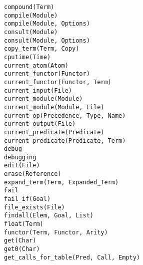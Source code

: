 \begin{tabbing}
 \> {\tt compound(Term)}	\>					\\
 \> {\tt compile(Module)}	\>					\\
 \> {\tt compile(Module, Options)} \>					\\
 \> {\tt consult(Module)}	\>					\\
 \> {\tt consult(Module, Options)} \>					\\
 \> {\tt copy\_term(Term, Copy)} \>					\\
 \> {\tt cputime(Time)}		\>					\\
 \> {\tt current\_atom(Atom)}	\>				\\
 \> {\tt current\_functor(Functor)} \>				\\
 \> {\tt current\_functor(Functor, Term)} \>				\\
 \> {\tt current\_input(File)}	\>					\\
 \> {\tt current\_module(Module)}	\>				\\
 \> {\tt current\_module(Module, File)}	\>				\\
 \> {\tt current\_op(Precedence, Type, Name)} \>			\\
 \> {\tt current\_output(File)}	\>					\\
 \> {\tt current\_predicate(Predicate)} \>				\\
 \> {\tt current\_predicate(Predicate, Term)} \>			\\
 \> {\tt debug}			\>					\\
 \> {\tt debugging}		\>					\\
 \> {\tt edit(File)}		\>					\\
 \> {\tt erase(Reference)}	\>					\\
 \> {\tt expand\_term(Term, Expanded\_Term)} \>				\\
 \> {\tt fail}			\>					\\
 \> {\tt fail\_if(Goal)}	\>					\\
 \> {\tt file\_exists(File)}	\>					\\
 \> {\tt findall(Elem, Goal, List)} \>					\\
 \> {\tt float(Term)}		\>					\\
 \> {\tt functor(Term, Functor, Arity)} \>				\\
 \> {\tt get(Char)}		\>					\\
 \> {\tt get0(Char)}		\>					\\
 \> {\tt get\_calls\_for\_table(Pred, Call, Empty)} \>			\\

\end{tabbing}
